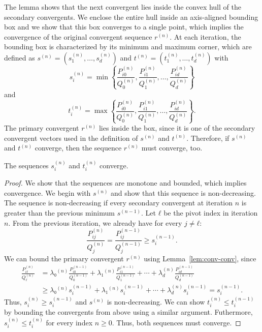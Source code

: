 The lemma shows that the next convergent lies inside the convex hull of the secondary convergents.
We enclose the entire hull inside an axis-aligned bounding box
and we show that this box converges to a single point,
which implies the convergence of the original convergent sequence $r^{(n)}$.
At each iteration, the bounding box is characterized by its minimum and maximum corner,
which are defined as $s^{(n)} = (s_1^{(n)}, …, s_d^{(n)})$ and $t^{(n)} = (t_1^{(n)}, …, t_d^{(n)})$ with
\[
  s_i^{(n)} = \min\left\{\frac{P_{i0}^{(n)}}{Q_0^{(n)}}, \frac{P_{i1}^{(n)}}{Q_1^{(n)}}, …, \frac{P_{id}^{(n)}}{Q_d^{(n)}}\right\}
\]
and
\[
  t_i^{(n)} = \max\left\{\frac{P_{i0}^{(n)}}{Q_0^{(n)}}, \frac{P_{i1}^{(n)}}{Q_1^{(n)}}, …, \frac{P_{id}^{(n)}}{Q_d^{(n)}}\right\}.
\]
The primary convergent $r^{(n)}$ lies inside the box,
since it is one of the secondary convergent vectors
used in the definition of $s^{(n)}$ and $t^{(n)}$.
Therefore, if $s^{(n)}$ and $t^{(n)}$ converge,
then the sequence $r^{(n)}$ must converge, too.

\begin{lemma}
  The sequences $s_i^{(n)}$ and $t_i^{(n)}$ converge.
\end{lemma}

\begin{proof}
  We show that the sequences are monotone and bounded, which implies convergence.
  We begin with $s^{(n)}$ and show that this sequence is non-decreasing.
  The sequence is non-decreasing if every secondary convergent at iteration $n$
  is greater than the previous minimum $s^{(n-1)}$.
  Let $ℓ$ be the pivot index in iteration $n$.
  From the previous iteration, we already have for every $j ≠ ℓ$:
  \[
    \frac{P_{ij}^{(n)}}{Q_j^{(n)}} = \frac{P_{ij}^{(n-1)}}{Q_j^{(n-1)}} ≥ s_i^{(n-1)}.
  \]
  We can bound the primary convergent $r^{(n)}$ using Lemma~\ref{lem:conv-conv}, since
  \begin{align*}
    \frac{P_{iℓ}^{(n)}}{Q_ℓ^{(n)}}
    & = λ₀^{(n)} \frac{P_{i0}^{(n-1)}}{Q_0^{(n-1)}} + λ₁^{(n)} \frac{P_{i1}^{(n-1)}}{Q_1^{(n-1)}} + ⋯ + λ_d^{(n)} \frac{P_{id}^{(n-1)}}{Q_d^{(n-1)}} \\
    & ≥ λ₀^{(n)} s_i^{(n-1)} + λ₁^{(n)} s_i^{(n-1)} + ⋯ + λ_d^{(n)} s_i^{(n-1)}
      = s_i^{(n-1)}.
  \end{align*}
  Thus, $s_i^{(n)} ≥ s_i^{(n-1)}$ and $s^{(n)}$ is non-decreasing.
  We can show $t_i^{(n)} ≤ t_i^{(n-1)}$ by bounding the convergents from above using a similar argument.
  Futhermore, $s_i^{(n)} ≤ t_i^{(n)}$ for every index $n ≥ 0$.
  Thus, both sequences must converge.
\end{proof}

